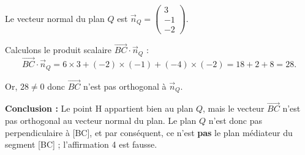Le vecteur normal du plan $Q$ est $\vec{n}_Q = \begin{pmatrix} 3 \\ -1 \\ -2 \end{pmatrix}$.

Calculons le produit scalaire $\vec{BC} \cdot \vec{n}_Q$ :
\[
\vec{BC} \cdot \vec{n}_Q = 6 \times 3 + (-2) \times (-1) + (-4) \times (-2) = 18 + 2 + 8 = 28.
\]

Or, $28 \neq 0$ donc $\vec{BC}$ n'est pas orthogonal à $\vec{n}_Q$.

\vspace{0.5em}

\textbf{Conclusion :} Le point H appartient bien au plan $Q$, mais le vecteur $\vec{BC}$ n'est pas orthogonal au vecteur normal du plan. Le plan $Q$ n'est donc pas perpendiculaire à [BC], et par conséquent, ce n'est \textbf{pas} le plan médiateur du segment [BC] ; l'affirmation 4 est fausse.


\medskip

